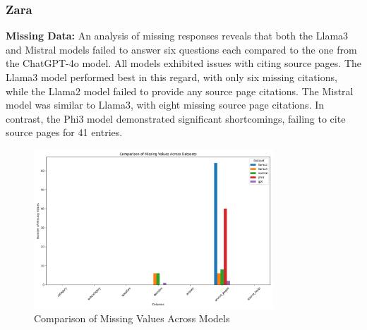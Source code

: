 \documentclass[]{article}
\begin{document}
\subsubsection{Zara}
\textbf{Missing Data:} An analysis of missing responses reveals that both the Llama3 and 
Mistral models failed to answer six questions each compared to the one from the ChatGPT-4o model.
All models exhibited issues with citing source pages. 
The Llama3 model performed best in this regard, with only six missing citations, 
while the Llama2 model failed to provide any source page citations. The Mistral model was similar to Llama3, 
with eight missing source page citations. In contrast, the Phi3 model demonstrated significant shortcomings, 
failing to cite source pages for 41 entries.

\begin{figure}[H]
    \centering
    \includegraphics[width=0.8\textwidth]{./images/Missing_Values.png}
    \caption{Comparison of Missing Values Across Models}
    \label{fig:image_label}
\end{figure}
\end{document}
